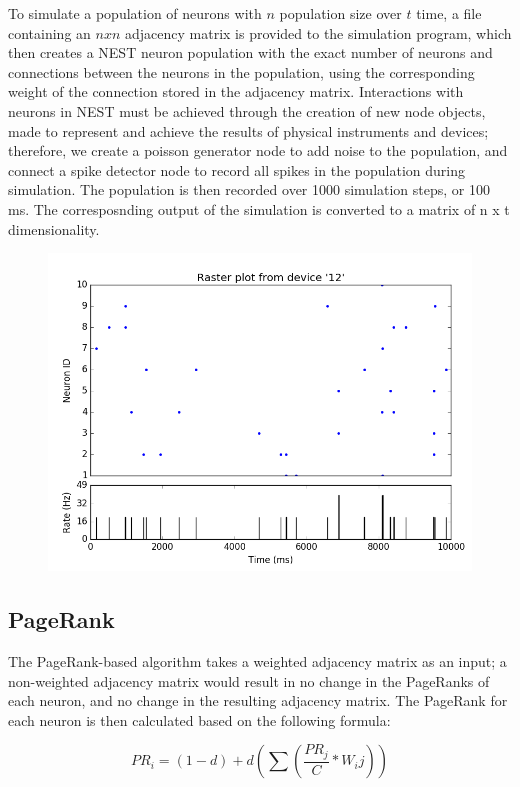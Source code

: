 \documentclass[11pt]{article}
\begin{document}
To simulate a population of neurons with $n$ population size over $t$ time, a file containing an $n x n$ adjacency matrix is provided to the simulation program, which then creates a NEST neuron population with the exact number of neurons and connections between the neurons in the population, using the corresponding weight of the connection stored in the adjacency matrix. Interactions with neurons in NEST must be achieved through the creation of new node objects, made to represent and achieve the results of physical instruments and devices; therefore, we create a poisson generator node to add noise to the population, and connect a spike detector node to record all spikes in the population during simulation. The population is then recorded over 1000 simulation steps, or 100 ms. The corresposnding output of the simulation is converted to a matrix of n x t dimensionality.\par
\begin{figure}[H]
\centering
	\includegraphics[scale=0.5]{./Figures/figure1.png} 
\end{figure}

\subsection{PageRank}
The PageRank-based algorithm takes a weighted adjacency matrix as an input; a non-weighted adjacency matrix would result in no change in the PageRanks of each neuron, and no change in the resulting adjacency matrix. The PageRank for each neuron is then calculated based on the following formula:

$$PR_i = (1-d)+d(\sum(\frac{PR_j}{C} * W_ij))$$
\end{document}
